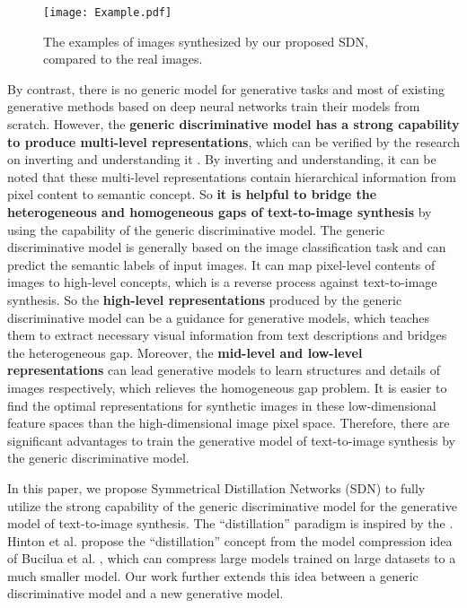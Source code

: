 \documentclass[sigconf]{acmart}
\begin{document}
\begin{figure}[t]
	\begin{center}
		\texttt{[image: Example.pdf]}
	\end{center}
	\caption{The examples of images synthesized by our proposed SDN, compared to the real images.}
	\label{fig:example}
\end{figure}

By contrast, there is no generic model for generative tasks and most of existing generative methods based on deep neural networks train their models from scratch. However, the \textbf{generic discriminative model has a strong capability to produce multi-level representations}, which can be verified by the research on inverting and understanding it \cite{mahendran2015understanding, dosovitskiy2016inverting, zhang2016augmenting}. By inverting and understanding, it can be noted that these multi-level representations contain hierarchical information from pixel content to semantic concept. So \textbf{it is helpful to bridge the heterogeneous and homogeneous gaps of text-to-image synthesis} by using the capability of the generic discriminative model. The generic discriminative model is generally based on the image classification task and can predict the semantic labels of input images. It can map pixel-level contents of images to high-level concepts, which is a reverse process against text-to-image synthesis. So the \textbf{high-level representations} produced by the generic discriminative model can be a guidance for generative models, which teaches them to extract necessary visual information from text descriptions and bridges the heterogeneous gap. Moreover, the \textbf{mid-level and low-level representations} can lead generative models to learn structures and details of images respectively, which relieves the homogeneous gap problem. It is easier to find the optimal representations for synthetic images in these low-dimensional feature spaces than the high-dimensional image pixel space. Therefore, there are significant advantages to train the generative model of text-to-image synthesis by the generic discriminative model.

In this paper, we propose Symmetrical Distillation Networks (SDN) to fully utilize the strong capability of the generic discriminative model for the generative model of text-to-image synthesis. The ``distillation'' paradigm is inspired by the \cite{hinton2015distilling}. Hinton et al. \cite{hinton2015distilling} propose the ``distillation'' concept from the model compression idea of Bucilua et al. \cite{bucilua2006model}, which can compress large models trained on large datasets to a much smaller model. Our work further extends this idea between a generic discriminative model and a new generative model.
\end{document}
